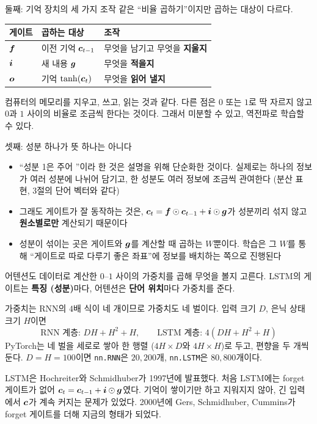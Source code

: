 \documentclass[aspectratio=169,11pt]{beamer}
\begin{document}
\begin{frame}{둘째: 기억 장치의 세 가지 조작}
같은 ``비율 곱하기''이지만 곱하는 대상이 다르다.
\vskip2mm
\centering
\begin{tabular}{@{}lll@{}}
\toprule
게이트 & 곱하는 대상 & 조작 \\
\midrule
$\bm{f}$ & 이전 기억 $\bm{c}_{t-1}$ & 무엇을 남기고 무엇을 \textbf{지울지} \\
$\bm{i}$ & 새 내용 $\bm{g}$ & 무엇을 \textbf{적을지} \\
$\bm{o}$ & 기억 $\tanh(\bm{c}_t)$ & 무엇을 \textbf{읽어 낼지} \\
\bottomrule
\end{tabular}
\vskip3mm
\raggedright
컴퓨터의 메모리를 지우고, 쓰고, 읽는 것과 같다.
다른 점은 $0$ 또는 $1$로 딱 자르지 않고 $0$과 $1$ 사이의 비율로 조금씩 한다는 것이다.
그래서 미분할 수 있고, 역전파로 학습할 수 있다.
\end{frame}

\begin{frame}{셋째: 성분 하나가 뜻 하나는 아니다}
\begin{itemize}
\item ``성분 1은 주어 ''이라 한 것은 설명을 위해 단순화한 것이다.
실제로는 하나의 정보가 여러 성분에 나뉘어 담기고, 한 성분도 여러 정보에 조금씩 관여한다
(분산 표현, 3절의 단어 벡터와 같다)
\item 그래도 게이트가 잘 동작하는 것은,
$\bm{c}_t=\bm{f}\odot\bm{c}_{t-1}+\bm{i}\odot\bm{g}$가 성분끼리 섞지 않고
\textbf{원소별로만} 계산되기 때문이다
\item 성분이 섞이는 곳은 게이트와 $\bm{g}$를 계산할 때 곱하는 $W$뿐이다.
학습은 그 $W$를 통해 ``게이트로 따로 다루기 좋은 좌표''에 정보를 배치하는 쪽으로 진행된다
\end{itemize}
\vskip2mm
\begin{thinkbox}
어텐션도 데이터로 계산한 $0$--$1$ 사이의 가중치를 곱해 무엇을 볼지 고른다.
LSTM의 게이트는 \textbf{특징 (성분)}마다, 어텐션은 \textbf{단어 위치}마다 가중치를 준다.
\end{thinkbox}
\end{frame}

\begin{frame}{가중치는 RNN의 $4$배}
식이 네 개이므로 가중치도 네 벌이다. 입력 크기 $D$, 은닉 상태 크기 $H$이면
\[
\text{RNN 계층: }DH+H^2+H,\qquad \text{LSTM 계층: }4(DH+H^2+H)
\]
PyTorch는 네 벌을 세로로 쌓아 한 행렬 ($4H\times D$와 $4H\times H$)로 두고, 편향을 두 개씩 둔다.
$D=H=100$이면 \texttt{nn.RNN}은 $20{,}200$개, \texttt{nn.LSTM}은 $80{,}800$개이다.
\vskip3mm
\begin{remarkbox}[역사]
LSTM은 Hochreiter와 Schmidhuber가 1997년에 발표했다.
처음 LSTM에는 forget 게이트가 없어 $\bm{c}_t=\bm{c}_{t-1}+\bm{i}\odot\bm{g}$였다.
기억이 쌓이기만 하고 지워지지 않아, 긴 입력에서 $\bm{c}$가 계속 커지는 문제가 있었다.
2000년에 Gers, Schmidhuber, Cummins가 forget 게이트를 더해 지금의 형태가 되었다.
\end{remarkbox}
\end{frame}
\end{document}
